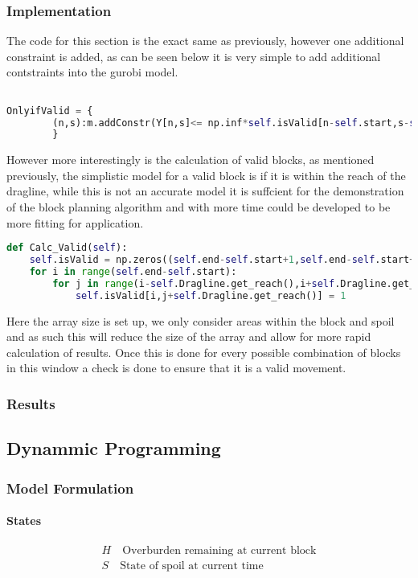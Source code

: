 \subsubsection{Implementation}
The code for this section is the exact same as previously, however one additional constraint is added, as can be seen below it is very simple to add additional contstraints into the gurobi model.
\begin{lstlisting}[language=python]

OnlyifValid = {
		(n,s):m.addConstr(Y[n,s]<= np.inf*self.isValid[n-self.start,s-self.start-self.Dragline.get_reach()]) for n in self.N for s in self.S
		}
\end{lstlisting}
However more interestingly is the calculation of valid blocks, as mentioned previously, the simplistic model for a valid block is if it is within the reach of the dragline, while this is not an accurate model it is suffcient for the demonstration of the block planning algorithm and with more time could be developed to be more fitting for application. 
\begin{lstlisting}[language = python]
def Calc_Valid(self):
	self.isValid = np.zeros((self.end-self.start+1,self.end-self.start+2*self.Dragline.get_reach()+1))
	for i in range(self.end-self.start):
		for j in range(i-self.Dragline.get_reach(),i+self.Dragline.get_reach()):
			self.isValid[i,j+self.Dragline.get_reach()] = 1
\end{lstlisting}
Here the array size is set up, we only consider areas within the block and spoil and as such this will reduce the size of the array and allow for more rapid calculation of results. Once this is done for every possible combination of blocks in this window a check is done to ensure that it is a valid movement. 
\subsubsection{Results}


\subsection{Dynammic Programming}
\subsubsection{Model Formulation}
\paragraph*{States}
\begin{align}
\label{DP:state1}
H \quad \text{Overburden remaining at current block}\\
\label{state2}
S \quad \text{State of spoil at current time}
\end{align}
